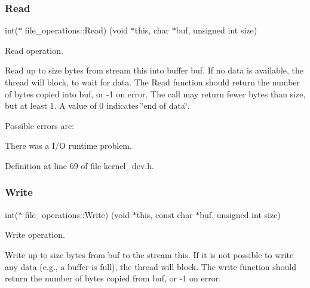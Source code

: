 \mbox{\label{structfile__operations_a59d973a490a6861c498ac9cc9c32dbf5}} 
\subsubsection{\texorpdfstring{Read}{Read}}
{\footnotesize\ttfamily int($\ast$ file\+\_\+operations\+::\+Read) (void $\ast$this, char $\ast$buf, unsigned int size)}



Read operation. 

Read up to \textquotesingle{}size\textquotesingle{} bytes from stream \textquotesingle{}this\textquotesingle{} into buffer \textquotesingle{}buf\textquotesingle{}. If no data is available, the thread will block, to wait for data. The Read function should return the number of bytes copied into buf, or -\/1 on error. The call may return fewer bytes than \textquotesingle{}size\textquotesingle{}, but at least 1. A value of 0 indicates \char`\"{}end of data\char`\"{}.

Possible errors are\+:
\begin{DoxyItemize}
\item There was a I/O runtime problem. 
\end{DoxyItemize}

Definition at line 69 of file kernel\+\_\+dev.\+h.

\mbox{\label{structfile__operations_a75d4020e8a146c1611dc40184d211ec6}} 
\subsubsection{\texorpdfstring{Write}{Write}}
{\footnotesize\ttfamily int($\ast$ file\+\_\+operations\+::\+Write) (void $\ast$this, const char $\ast$buf, unsigned int size)}



Write operation. 

Write up to \textquotesingle{}size\textquotesingle{} bytes from \textquotesingle{}buf\textquotesingle{} to the stream \textquotesingle{}this\textquotesingle{}. If it is not possible to write any data (e.\+g., a buffer is full), the thread will block. The write function should return the number of bytes copied from buf, or -\/1 on error.

